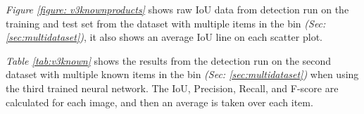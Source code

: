 \textit{Figure \ref{figure: v3knownproducts}} shows raw IoU data from detection run on the training and test set from the dataset with multiple items in the bin \textit{(Sec: \ref{sec:multidataset})}, it also shows an average IoU line on each scatter plot.


\begin{table}[h]
\caption{Detection results when tested on trained data using the third neural network.}
\label{tab:v3known}
\end{table}
\textit{Table \ref{tab:v3known}} shows the results from the detection run on the second dataset with multiple known items in the bin \textit{(Sec: \ref{sec:multidataset})} when using the third trained neural network. The IoU, Precision, Recall, and F-score are calculated for each image, and then an average is taken over each item. 

